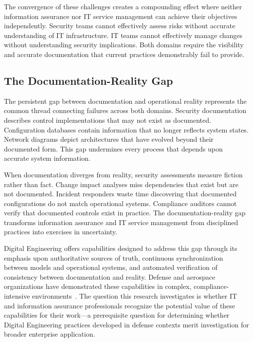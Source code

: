 The convergence of these challenges creates a compounding effect where neither information assurance nor IT service management can achieve their objectives independently. Security teams cannot effectively assess risks without accurate understanding of IT infrastructure. IT teams cannot effectively manage changes without understanding security implications. Both domains require the visibility and accurate documentation that current practices demonstrably fail to provide.

\subsection{The Documentation-Reality Gap}

The persistent gap between documentation and operational reality represents the common thread connecting failures across both domains. Security documentation describes control implementations that may not exist as documented. Configuration databases contain information that no longer reflects system states. Network diagrams depict architectures that have evolved beyond their documented form. This gap undermines every process that depends upon accurate system information.

When documentation diverges from reality, security assessments measure fiction rather than fact. Change impact analyses miss dependencies that exist but are not documented. Incident responders waste time discovering that documented configurations do not match operational systems. Compliance auditors cannot verify that documented controls exist in practice. The documentation-reality gap transforms information assurance and IT service management from disciplined practices into exercises in uncertainty.

Digital Engineering offers capabilities designed to address this gap through its emphasis upon authoritative sources of truth, continuous synchronization between models and operational systems, and automated verification of consistency between documentation and reality. Defense and aerospace organizations have demonstrated these capabilities in complex, compliance-intensive environments~\parencite{DoD_DE_Strategy_2018}. The question this research investigates is whether IT and information assurance professionals recognize the potential value of these capabilities for their work---a prerequisite question for determining whether Digital Engineering practices developed in defense contexts merit investigation for broader enterprise application.

